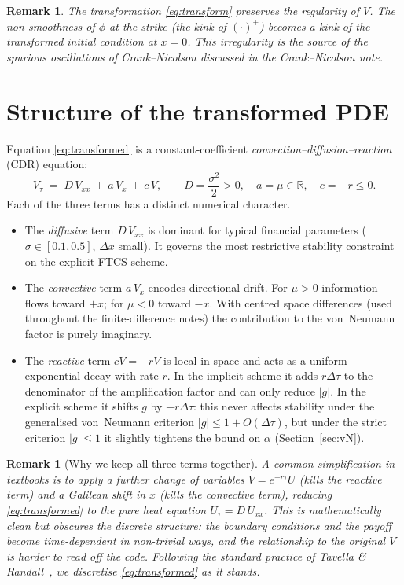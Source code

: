 \documentclass[11pt,a4paper]{article}
\newtheorem{remark}[proposition]{Remark}
\begin{document}
\begin{remark}
The transformation \eqref{eq:transform} preserves the regularity of
$V$. The non-smoothness of $\phi$ at the strike (the kink of
$(\cdot)^+$) becomes a kink of the transformed initial condition at
$x = 0$. This irregularity is the source of the spurious oscillations
of Crank--Nicolson discussed in the Crank--Nicolson note.
\end{remark}

\section{Structure of the transformed PDE}

Equation \eqref{eq:transformed} is a constant-coefficient
\emph{convection--diffusion--reaction} (CDR) equation:
\[
V_\tau \;=\; D\, V_{xx} \,+\, a\, V_x \,+\, c\, V,
\qquad
D = \frac{\sigma^2}{2} > 0,\quad
a = \mu \in \mathbb{R},\quad
c = -r \le 0.
\]
Each of the three terms has a distinct numerical character.
\begin{itemize}[leftmargin=2em]
\item The \emph{diffusive} term $D\, V_{xx}$ is dominant for typical
      financial parameters ($\sigma \in [0.1, 0.5]$, $\Delta x$ small).
      It governs the most restrictive stability constraint on the
      explicit FTCS scheme.
\item The \emph{convective} term $a\, V_x$ encodes directional drift.
      For $\mu > 0$ information flows toward $+x$; for $\mu < 0$
      toward $-x$. With centred space differences (used throughout
      the finite-difference notes) the contribution to the von~Neumann factor is purely
      imaginary.
\item The \emph{reactive} term $c V = -rV$ is local in space and acts
      as a uniform exponential decay with rate $r$. In the implicit
      scheme it adds $r\Delta\tau$ to the denominator of the
      amplification factor and can only reduce $|g|$. In the explicit
      scheme it shifts $g$ by $-r\Delta\tau$: this never affects
      stability under the generalised von~Neumann criterion
      $|g| \le 1 + O(\Delta\tau)$, but under the strict criterion
      $|g| \le 1$ it slightly tightens the bound on $\alpha$
      (Section~\ref{sec:vN}).
\end{itemize}

\begin{remark}[Why we keep all three terms together]
A common simplification in textbooks is to apply a further change of
variables $V = e^{-r\tau} U$ (kills the reactive term) and a Galilean
shift in $x$ (kills the convective term), reducing
\eqref{eq:transformed} to the pure heat equation $U_\tau = D\,U_{xx}$.
This is mathematically clean but obscures the discrete structure: the
boundary conditions and the payoff become time-dependent in non-trivial
ways, and the relationship to the original $V$ is harder to read off
the code. Following the standard practice of Tavella \&
Randall~\cite{TavellaRandall2000}, we discretise
\eqref{eq:transformed} as it stands.
\end{remark}
\end{document}
